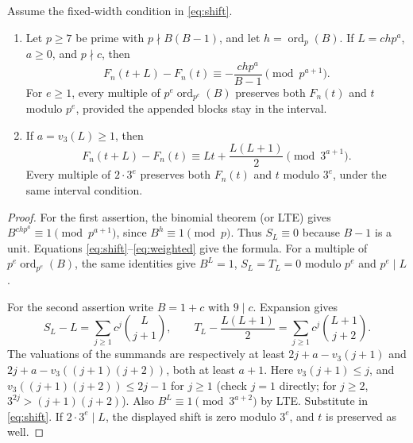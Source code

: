 \begin{lemma}\label{lem:shifts}
Assume the fixed-width condition in \eqref{eq:shift}.
\begin{enumerate}
\item Let $p\ge7$ be prime with $p\nmid B(B-1)$, and let
$h=\operatorname{ord}_p(B)$. If $L=chp^a$, $a\ge0$, and $p\nmid c$, then
\[
 F_n(t+L)-F_n(t)\equiv-\frac{chp^a}{B-1}\pmod{p^{a+1}}.
\]
For $e\ge1$, every multiple of
$p^e\operatorname{ord}_{p^e}(B)$ preserves both $F_n(t)$ and $t$
modulo $p^e$, provided the appended blocks stay in the interval.
\item If $a=v_3(L)\ge1$, then
\[
 F_n(t+L)-F_n(t)\equiv Lt+\frac{L(L+1)}2\pmod{3^{a+1}}.
\]
Every multiple of $2\cdot3^e$ preserves both $F_n(t)$ and $t$
modulo $3^e$, under the same interval condition.
\end{enumerate}
\end{lemma}
\begin{proof}
For the first assertion, the binomial theorem (or LTE) gives
$B^{chp^a}\equiv1\pmod{p^{a+1}}$, since $B^h\equiv1\pmod p$.
Thus $S_L\equiv0$ because $B-1$ is a unit. Equations
\eqref{eq:shift}--\eqref{eq:weighted} give the formula.
For a multiple of $p^e\operatorname{ord}_{p^e}(B)$, the same identities
give $B^L=1$, $S_L=T_L=0$ modulo $p^e$ and $p^e\mid L$.

For the second assertion write $B=1+c$ with $9\mid c$. Expansion gives
\[
 S_L-L=\sum_{j\ge1}c^j\binom{L}{j+1},\qquad
 T_L-\frac{L(L+1)}2=\sum_{j\ge1}c^j\binom{L+1}{j+2}.
\]
The valuations of the summands are respectively at least
$2j+a-v_3(j+1)$ and $2j+a-v_3((j+1)(j+2))$, both at least $a+1$.
Here $v_3(j+1)\le j$, and
$v_3((j+1)(j+2))\le2j-1$ for $j\ge1$ (check $j=1$ directly;
for $j\ge2$, $3^{2j}>(j+1)(j+2)$).
Also $B^L\equiv1\pmod{3^{a+2}}$ by LTE. Substitute in
\eqref{eq:shift}. If $2\cdot3^e\mid L$, the displayed shift is
zero modulo $3^e$, and $t$ is preserved as well.
\end{proof}


